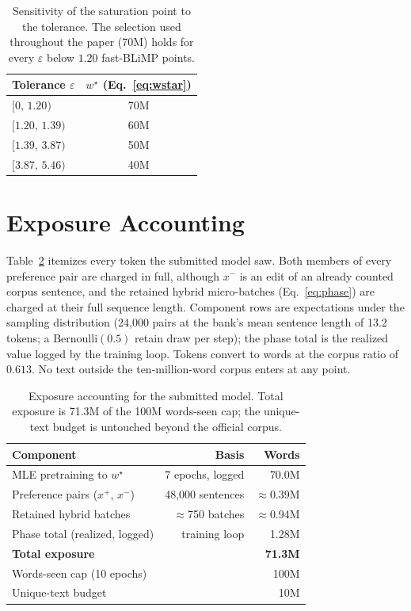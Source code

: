 \begin{table}[H]
  \centering
  \footnotesize
  \setlength{\tabcolsep}{6pt}
  \begin{tabular}{lc}
    \toprule
    \textbf{Tolerance} $\varepsilon$ & $w^{\star}$ (Eq.~\ref{eq:wstar}) \\
    \midrule
    $[0,\,1.20)$   & 70M \\
    $[1.20,\,1.39)$ & 60M \\
    $[1.39,\,3.87)$ & 50M \\
    $[3.87,\,5.46)$ & 40M \\
    \bottomrule
  \end{tabular}
  \caption{Sensitivity of the saturation point to the tolerance. The
  selection used throughout the paper (70M) holds for every
  $\varepsilon$ below $1.20$ fast-BLiMP points.}
  \label{tab:eps}
\end{table}

\section{Exposure Accounting}
\label{sec:app-budget}

Table~\ref{tab:budget} itemizes every token the submitted \MPO{} model
saw. Both members of every preference pair are charged in full, although
$x^{-}$ is an edit of an already counted corpus sentence, and the
retained hybrid micro-batches (Eq.~\ref{eq:phase}) are charged at their
full sequence length. Component rows are expectations under the sampling
distribution (24{,}000 pairs at the bank's mean sentence length of 13.2
tokens; a Bernoulli$(0.5)$ retain draw per step); the phase total is the
realized value logged by the training loop. Tokens convert to words at
the corpus ratio of $0.613$. No text outside the ten-million-word corpus
enters at any point.

\begin{table}[H]
  \centering
  \footnotesize
  \setlength{\tabcolsep}{4pt}
  \begin{tabular}{lrr}
    \toprule
    \textbf{Component} & \textbf{Basis} & \textbf{Words} \\
    \midrule
    MLE pretraining to $w^{\star}$ & 7 epochs, logged & 70.0M \\
    Preference pairs ($x^{+}$, $x^{-}$) & 48{,}000 sentences & $\approx$0.39M \\
    Retained hybrid batches & $\approx$750 batches & $\approx$0.94M \\
    \midrule
    Phase total (realized, logged) & training loop & 1.28M \\
    \textbf{Total exposure} & & \textbf{71.3M} \\
    \midrule
    Words-seen cap (10 epochs) & & 100M \\
    Unique-text budget & & 10M \\
    \bottomrule
  \end{tabular}
  \caption{Exposure accounting for the submitted \MPO{} model. Total
  exposure is 71.3M of the 100M words-seen cap; the unique-text budget is
  untouched beyond the official corpus.}
  \label{tab:budget}
\end{table}

